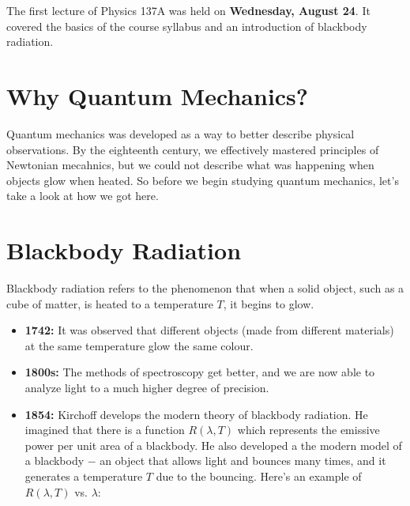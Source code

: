 The first lecture of Physics 137A was held on  \textbf{Wednesday, August 24}. It covered the basics of the course syllabus and an introduction of blackbody radiation.

      \section{Why Quantum Mechanics?}
        Quantum mechanics was developed as a way to better describe physical observations. By the eighteenth century, we effectively mastered principles of Newtonian mecahnics, but we could not describe what was happening when objects glow when heated. So before we begin studying quantum mechanics, let's take a look at how we got here.

      \section{Blackbody Radiation}
        Blackbody radiation refers to the phenomenon that when a solid object, such as a cube of matter, is heated to a temperature $T$, it begins to glow.

        \begin{itemize}
          \item \textbf{1742:} It was observed that different objects (made from different materials) at the same temperature glow the same colour.
          \item \textbf{1800s:} The methods of spectroscopy get better, and we are now able to analyze light to a much higher degree of precision.
          \item \textbf{1854:} Kirchoff develops the modern theory of blackbody radiation. He imagined that there is a function $R(\lambda, T)$ which represents the emissive power per unit area of a blackbody. He also developed a the modern model of a blackbody $-$ an object that allows light and bounces many times, and it generates a temperature $T$ due to the bouncing. Here's an example of $R(\lambda, T)$ vs. $\lambda$:

          \begin{center}
          \end{center}
        \end{itemize}

